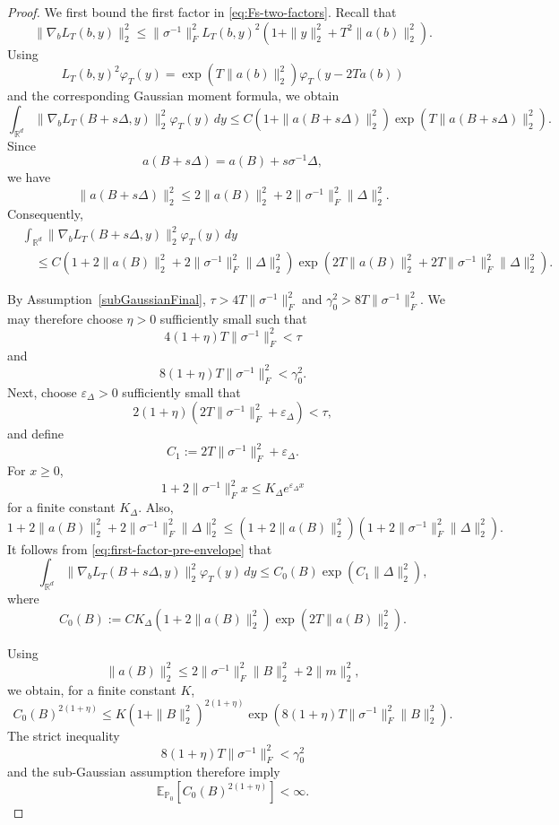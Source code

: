 \documentclass[11pt]{article}
\theoremstyle{definition}
\newcommand{\R}{\mathbb{R}}
\newcommand{\E}{\mathbb{E}}
\begin{document}
\begin{proof}
We first bound the first factor in \eqref{eq:Fs-two-factors}. Recall that
\[
\|\nabla_bL_T(b,y)\|_2^2
\leq
\|\sigma^{-1}\|_F^2
L_T(b,y)^2
\left(
1+\|y\|_2^2+T^2\|a(b)\|_2^2
\right).
\]
Using
\[
L_T(b,y)^2\varphi_T(y)
=
\exp\!\left(T\|a(b)\|_2^2\right)
\varphi_T(y-2Ta(b))
\]
and the corresponding Gaussian moment formula, we obtain
\[
\int_{\R^d}
\|\nabla_bL_T(B+s\Delta,y)\|_2^2
\varphi_T(y)\,dy
\leq
C
\left(
1+\|a(B+s\Delta)\|_2^2
\right)
\exp\!\left(
T\|a(B+s\Delta)\|_2^2
\right).
\]
Since
\[
a(B+s\Delta)=a(B)+s\sigma^{-1}\Delta,
\]
we have
\[
\|a(B+s\Delta)\|_2^2
\leq
2\|a(B)\|_2^2
+
2\|\sigma^{-1}\|_F^2\|\Delta\|_2^2.
\]
Consequently,
\begin{align}
&\int_{\R^d}
\|\nabla_bL_T(B+s\Delta,y)\|_2^2
\varphi_T(y)\,dy \nonumber\\
&\quad\leq
C
\left(
1+2\|a(B)\|_2^2
+2\|\sigma^{-1}\|_F^2\|\Delta\|_2^2
\right)
\exp\!\left(
2T\|a(B)\|_2^2
+2T\|\sigma^{-1}\|_F^2\|\Delta\|_2^2
\right).
\label{eq:first-factor-pre-envelope}
\end{align}

By Assumption~\ref{subGaussianFinal}, $\tau>4T\|\sigma^{-1}\|_F^2$ and $\gamma_0^2>8T\|\sigma^{-1}\|_F^2.$
We may therefore choose $\eta>0$ sufficiently small such that
\[
4(1+\eta)T\|\sigma^{-1}\|_F^2<\tau
\]
and
\[
8(1+\eta)T\|\sigma^{-1}\|_F^2<\gamma_0^2.
\]
Next, choose $\varepsilon_\Delta>0$ sufficiently small that
\[
2(1+\eta)
\left(
2T\|\sigma^{-1}\|_F^2+\varepsilon_\Delta
\right)
<\tau,
\]
and define
\[
C_1
:=
2T\|\sigma^{-1}\|_F^2+\varepsilon_\Delta.
\]
For $x\geq0$,
\[
1+2\|\sigma^{-1}\|_F^2x
\leq
K_\Delta e^{\varepsilon_\Delta x}
\]
for a finite constant $K_\Delta$. Also,
\[
1+2\|a(B)\|_2^2
+2\|\sigma^{-1}\|_F^2\|\Delta\|_2^2
\leq
\left(
1+2\|a(B)\|_2^2
\right)
\left(
1+2\|\sigma^{-1}\|_F^2\|\Delta\|_2^2
\right).
\]
It follows from \eqref{eq:first-factor-pre-envelope} that
\begin{equation}\label{eq:first-factor-envelope}
\int_{\R^d}
\|\nabla_bL_T(B+s\Delta,y)\|_2^2
\varphi_T(y)\,dy
\leq
C_0(B)
\exp\!\left(C_1\|\Delta\|_2^2\right),
\end{equation}
where
\[
C_0(B)
:=
CK_\Delta
\left(
1+2\|a(B)\|_2^2
\right)
\exp\!\left(
2T\|a(B)\|_2^2
\right).
\]

Using
\[
\|a(B)\|_2^2
\leq
2\|\sigma^{-1}\|_F^2\|B\|_2^2
+2\|m\|_2^2,
\]
we obtain, for a finite constant $K$,
\[
C_0(B)^{2(1+\eta)}
\leq
K
\left(
1+\|B\|_2^2
\right)^{2(1+\eta)}
\exp\!\left(
8(1+\eta)T
\|\sigma^{-1}\|_F^2
\|B\|_2^2
\right).
\]
The strict inequality
\[
8(1+\eta)T\|\sigma^{-1}\|_F^2<\gamma_0^2
\]
and the sub-Gaussian assumption therefore imply
\begin{equation}\label{eq:C0-moment}
\E_{\mathbb P_0}
\left[
C_0(B)^{2(1+\eta)}
\right]
<\infty.
\end{equation}


\end{proof}
\end{document}
